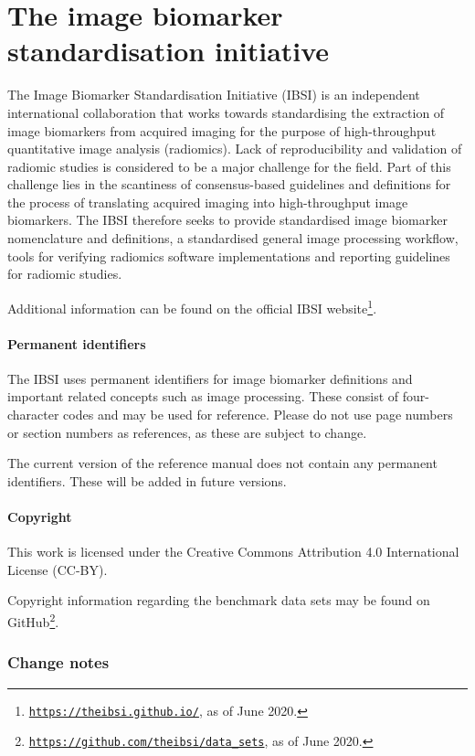 \documentclass[fleqn,a4paper,oneside,openany]{book}
\begin{document}
\newpage
\chapter*{The image biomarker standardisation initiative}
The Image Biomarker Standardisation Initiative (IBSI) is an independent international collaboration that works towards standardising the extraction of image biomarkers from acquired imaging for the purpose of high-throughput quantitative image analysis (radiomics). Lack of reproducibility and validation of radiomic studies is considered to be a major challenge for the field. Part of this challenge lies in the scantiness of consensus-based guidelines and definitions for the process of translating acquired imaging into high-throughput image biomarkers. The IBSI therefore seeks to provide standardised image biomarker nomenclature and definitions, a standardised general image processing workflow, tools for verifying radiomics software implementations and reporting guidelines for radiomic studies.

Additional information can be found on the official IBSI website\footnote{\texttt{\url{https://theibsi.github.io/}}, as of June 2020.}.

\subsubsection*{Permanent identifiers}
The IBSI uses permanent identifiers for image biomarker definitions and important related concepts such as image processing. These consist of four-character codes and may be used for reference. Please do not use page numbers or section numbers as references, as these are subject to change.

The current version of the reference manual does not contain any permanent identifiers. These will be added in future versions.

\subsubsection*{Copyright}
This work is licensed under the Creative Commons Attribution 4.0 International License (CC-BY).

Copyright information regarding the benchmark data sets may be found on GitHub\footnote{\texttt{\url{https://github.com/theibsi/data\_sets}}, as of June 2020.}.

\subsection*{Change notes}
\end{document}
